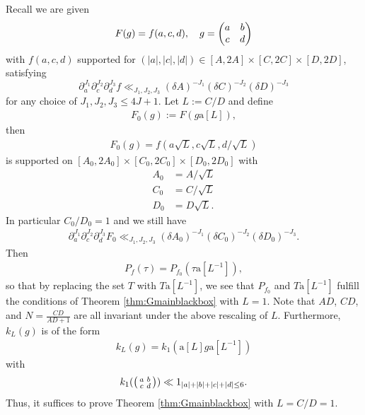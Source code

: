 \documentclass[12pt]{amsart}
\theoremstyle{definition}
\theoremstyle{remark}
\numberwithin{equation}{section}
\newcommand{\1}{{\mathbf 1}}
\renewcommand{\a}{\mathrm{a}}
\begin{document}
Recall we are given 
\begin{align*}
 F(g)=f(a,c,d) ,\quad g = \mqty(a & b \\ c& d)  
\end{align*}
with $f( a, c, d)$ supported for $(|a|,|c|,|d|) \in [A,2A]\times [C,2C]\times [D,2D]$, satisfying
\[
\partial_a^{J_1} \partial_c^{J_2} \partial_d^{J_3} f \ll_{J_1,J_2,J_3} (\delta A)^{-J_1} (\delta C)^{-J_2} (\delta D)^{-J_3}
\]
for any choice of $J_1,J_2,J_3 \leq 4J+1$.
Let $L:= C/D$ and define
\begin{align*}
    F_0(g):=F(g \a[L]),
\end{align*}
then 
\begin{align*}
    F_0(g)=f(a \sqrt{L}, c\sqrt{L}, d/\sqrt{L})
\end{align*}
is supported on $[A_0,2A_0]\times [C_0,2C_0]\times [D_0,2D_0]$ with 
\begin{align*}
    A_0&=A/\sqrt{L}\\
    C_0&=C/\sqrt{L}\\
    D_0&=D \sqrt{L}.
\end{align*}
In particular $C_0/D_0=1$ and we still have
\begin{align}\label{eq:f0derivbound}
    \partial_a^{J_1} \partial_c^{J_2} \partial_d^{J_3} F_0 \ll_{J_1,J_2,J_3} (\delta A_0)^{-J_1} (\delta C_0)^{-J_2} (\delta D_0)^{-J_3}.
\end{align}
Then 
\begin{align*}
    P_f(\tau) = P_{f_0} (\tau \a[L^{-1}]),
\end{align*}
so that by replacing the set $T$ with $T \a[L^{-1}]$,  we see that $P_{f_0}$ and $T \a[L^{-1}]$ fulfill the conditions of Theorem \ref{thm:Gmainblackbox} with $L=1$. Note that $AD$, $CD$, and $N=\frac{CD}{AD+1}$ are all invariant under the above rescaling of $L$. Furthermore, $k_L(g)$ is of the form
\begin{align*}
    k_L(g) = k_1( \a[L] g \a[L^{-1}])
\end{align*}
with
\begin{align*}
k_1(\smqty(a & b \\ c& d)) \ll 1_{|a|+|b|+|c|+|d|\leq 6}.
\end{align*}
Thus, it suffices to prove Theorem \ref{thm:Gmainblackbox} with $L=C/D =1$.
\end{document}
